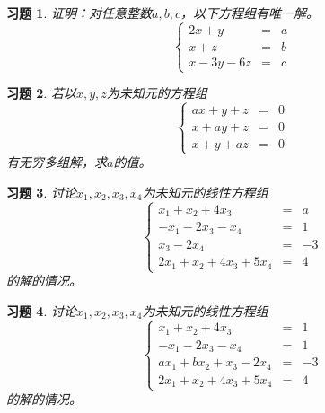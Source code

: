 \documentclass[a4paper]{book}
\newtheorem{ex}{习题}[chapter]
\begin{document}
\begin{ex} \label{ex:1.2}
证明：对任意整数$a,b,c$，以下方程组有唯一解。
$$\left\{ \begin{array}{rcl} 2x + y & = & a \\ x + z & = & b \\ x - 3y - 6z & = & c\end{array}\right.$$
\end{ex}

\begin{ex} \label{ex:1.3}
若以$x,y,z$为未知元的方程组
$$\left\{ \begin{array}{rcl} ax + y + z & = & 0 \\ x + ay + z & = & 0 \\ x + y + az & = & 0\end{array}\right.$$
有无穷多组解，求$a$的值。
\end{ex}

\begin{ex} \label{ex:1.4}
讨论$x_1,x_2,x_3,x_4$为未知元的线性方程组
$$\left\{ \begin{array}{rcl} x_1 + x_2 + 4x_3 & = & a \\ -x_1 - 2x_3 - x_4 & = & 1 \\ x_3 - 2x_4 & = & -3 \\ 2x_1 + x_2 + 4x_3 + 5x_4 & = & 4 \end{array}\right.$$
的解的情况。
\end{ex}

\begin{ex} \label{ex:1.5}
讨论$x_1,x_2,x_3,x_4$为未知元的线性方程组
$$\left\{ \begin{array}{rcl} x_1 + x_2 + 4x_3 & = & 1 \\ -x_1 - 2x_3 - x_4 & = & 1 \\ ax_1 + bx_2 + x_3 - 2x_4 & = & -3 \\ 2x_1 + x_2 + 4x_3 + 5x_4 & = & 4 \end{array}\right.$$
的解的情况。
\end{ex}
\end{document}
